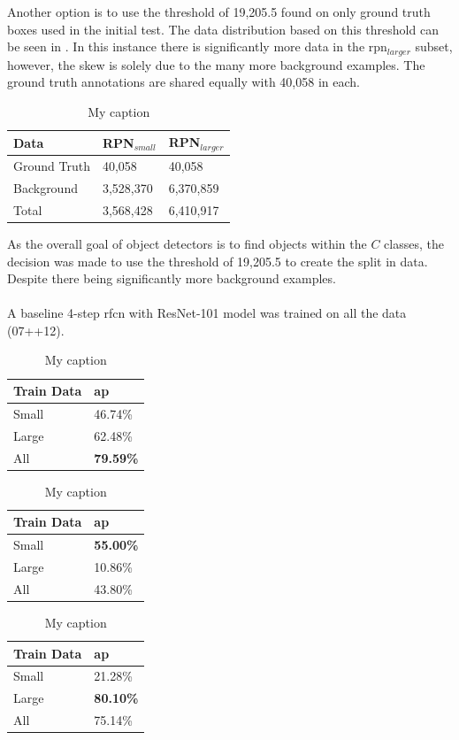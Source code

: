 Another option is to use the threshold of 19,205.5 found on only ground truth boxes used in the initial test. The data distribution based on this threshold can be seen in . In this instance there is significantly more data in the \gls{rpn}$_{larger}$ subset, however, the skew is solely due to the many more background examples. The ground truth annotations are shared equally with 40,058 in each.

\begin{table}[h]
\centering
\caption{My caption}
\label{tab:splitgt}
\begin{tabular}{|l|l|l|}
\hline
\textbf{Data} & \textbf{RPN$_{small}$} & \textbf{RPN$_{larger}$} \\ \hline
Ground Truth & 40,058    & 40,058     \\ 
Background   & 3,528,370 & 6,370,859  \\ \hline
Total        & 3,568,428 & 6,410,917  \\ \hline
\end{tabular}
\end{table}

As the overall goal of object detectors is to find objects within the $C$ classes, the decision was made to use the threshold of 19,205.5 to create the split in data. Despite there being significantly more background examples. 
\\\\
A baseline 4-step \gls{rfcn} with ResNet-101 model was trained on all the data (07++12).

\begin{table}[h]
\centering
\caption{My caption}
\label{my-label}
\begin{tabular}{|l|l|}
\hline
\textbf{Train Data} & \textbf{\gls{ap}}      \\ \hline
Small      & 46.74\% \\ \hline
Large      & 62.48\% \\ \hline
All        & \textbf{79.59\%} \\ \hline
\end{tabular}
\end{table}


\begin{table}[h]
\centering
\caption{My caption}
\label{my-label}
\begin{tabular}{|l|l|}
\hline
\textbf{Train Data} & \textbf{\gls{ap}}      \\ \hline
Small      & \textbf{55.00\%} \\ \hline
Large      & 10.86\% \\ \hline
All        & 43.80\% \\ \hline
\end{tabular}
\end{table}


\begin{table}[h]
\centering
\caption{My caption}
\label{my-label}
\begin{tabular}{|l|l|}
\hline
\textbf{Train Data} & \textbf{\gls{ap}}      \\ \hline
Small      & 21.28\% \\ \hline
Large      & \textbf{80.10\%} \\ \hline
All        & 75.14\% \\ \hline
\end{tabular}
\end{table}








